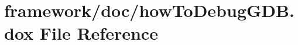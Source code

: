 \hypertarget{how_to_debug_g_d_b_8dox}{}\section{framework/doc/how\+To\+Debug\+G\+DB.dox File Reference}
\label{how_to_debug_g_d_b_8dox}
